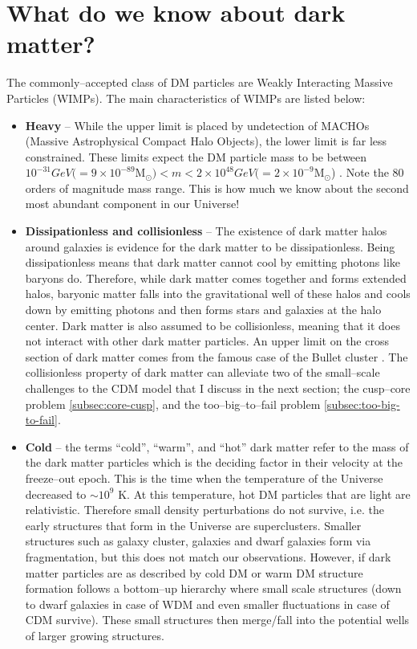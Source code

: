 \documentclass[a4wide,12pt]{book}
\newcommand{\msun }{$\mathrm{M}_{\odot}$}
\newcommand{\ignore}[1]{}
\begin{document}
{\section{What do we know about dark matter?}
\label{subsec:current state}
The commonly--accepted class of DM particles are Weakly Interacting Massive Particles (WIMPs). The main characteristics of WIMPs are listed below:
  \begin{itemize}
  \item {\bf Heavy} -- \ignore{The observational upper and lower bounds for dark matter particles come from different sources. }While the upper limit is placed by undetection of MACHOs (Massive Astrophysical Compact Halo Objects), the lower limit is far less constrained.\ignore{ Neither the Kepler satellite \citep[][]{Griest+2014}, nor microlensing surveys \citep[][]{Alcock+1998, Yoo+2004} did not detect MACHOs as predicted.} These limits expect the DM particle mass to be between $10^\mathrm{-31} GeV (= 9\times 10^\mathrm{-89}$\msun  $) < m < 2\times 10^\mathrm{48} GeV (= 2 \times 10^\mathrm{-9}$\msun ) \citep[\ignore{47 for lower bound}][\ignore{ and 42 \& 43 for the upper bound}]{Hu+2000, Alcock+1998, Yoo+2004}. Note the 80 orders of magnitude mass range. This is how much we know about the second most abundant component in our Universe!
  \item {\bf Dissipationless and collisionless} -- The existence of dark matter halos around galaxies is evidence for the dark matter to be dissipationless. Being dissipationless means that dark matter cannot cool by emitting photons like baryons do. Therefore, while dark matter comes together and forms extended halos, baryonic matter falls into the gravitational well of these halos and cools down by emitting photons and then forms stars and galaxies at the halo center. Dark matter is also assumed to be collisionless, meaning that it does not interact with other dark matter particles. An upper limit on the cross section of dark matter comes from the famous case of the Bullet cluster \citep[][]{Clowe+2006}. The collisionless property of dark matter can alleviate two of the small--scale challenges to the CDM model that I discuss in the next section; the cusp--core problem \ref{subsec:core-cusp}, and the too--big--to--fail problem \ref{subsec:too-big-to-fail}.
  \item {\bf Cold} -- the terms ``cold'', ``warm'', and ``hot'' dark matter refer to the mass of the dark matter particles which is the deciding factor in their velocity at the freeze--out epoch. This is the time when the temperature of the Universe decreased to $\sim 10^9$ K. At this temperature, hot DM particles that are light are relativistic. Therefore small density perturbations do not survive, i.e. the early structures that form in the Universe are superclusters. Smaller structures such as galaxy cluster, galaxies and dwarf galaxies form via fragmentation, but this does not match our observations. However, if dark matter particles are as described by cold DM or warm DM structure formation follows a bottom--up hierarchy where small scale structures (down to dwarf galaxies in case of WDM and even smaller fluctuations in case of CDM survive). These small structures then merge/fall into the potential wells of larger growing structures. 

\end{itemize}}
\end{document}
